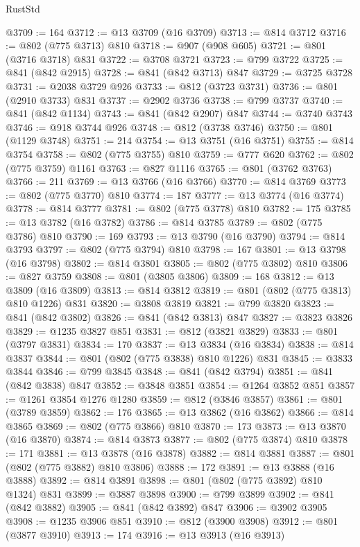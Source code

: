 \begin{lexlean}{RustStd}
\begin{coremodule}
{\begin{coremodule}
{{{{{@3709 := 164
@3712 := @13 @3709 (@16 @3709)
@3713 := @814 @3712
@3716 := @802 (@775 @3713) @810
@3718 := @907 (@908 @605)
@3721 := @801 (@3716 @3718) @831
@3722 := @3708 @3721
@3723 := @799 @3722
@3725 := @841 (@842 @2915)
@3728 := @841 (@842 @3713) @847
@3729 := @3725 @3728
@3731 := @2038 @3729 @926
@3733 := @812 (@3723 @3731)
@3736 := @801 (@2910 @3733) @831
@3737 := @2902 @3736
@3738 := @799 @3737
@3740 := @841 (@842 @1134)
@3743 := @841 (@842 @2907) @847
@3744 := @3740 @3743
@3746 := @918 @3744 @926
@3748 := @812 (@3738 @3746)
@3750 := @801 (@1129 @3748)
@3751 := 214
@3754 := @13 @3751 (@16 @3751)
@3755 := @814 @3754
@3758 := @802 (@775 @3755) @810
@3759 := @777 @620
@3762 := @802 (@775 @3759) @1161
@3763 := @827 @1116
@3765 := @801 (@3762 @3763)
@3766 := 211
@3769 := @13 @3766 (@16 @3766)
@3770 := @814 @3769
@3773 := @802 (@775 @3770) @810
@3774 := 187
@3777 := @13 @3774 (@16 @3774)
@3778 := @814 @3777
@3781 := @802 (@775 @3778) @810
@3782 := 175
@3785 := @13 @3782 (@16 @3782)
@3786 := @814 @3785
@3789 := @802 (@775 @3786) @810
@3790 := 169
@3793 := @13 @3790 (@16 @3790)
@3794 := @814 @3793
@3797 := @802 (@775 @3794) @810
@3798 := 167
@3801 := @13 @3798 (@16 @3798)
@3802 := @814 @3801
@3805 := @802 (@775 @3802) @810
@3806 := @827 @3759
@3808 := @801 (@3805 @3806)
@3809 := 168
@3812 := @13 @3809 (@16 @3809)
@3813 := @814 @3812
@3819 := @801 (@802 (@775 @3813) @810 @1226) @831
@3820 := @3808 @3819
@3821 := @799 @3820
@3823 := @841 (@842 @3802)
@3826 := @841 (@842 @3813) @847
@3827 := @3823 @3826
@3829 := @1235 @3827 @851
@3831 := @812 (@3821 @3829)
@3833 := @801 (@3797 @3831)
@3834 := 170
@3837 := @13 @3834 (@16 @3834)
@3838 := @814 @3837
@3844 := @801 (@802 (@775 @3838) @810 @1226) @831
@3845 := @3833 @3844
@3846 := @799 @3845
@3848 := @841 (@842 @3794)
@3851 := @841 (@842 @3838) @847
@3852 := @3848 @3851
@3854 := @1264 @3852 @851
@3857 := @1261 @3854 @1276 @1280
@3859 := @812 (@3846 @3857)
@3861 := @801 (@3789 @3859)
@3862 := 176
@3865 := @13 @3862 (@16 @3862)
@3866 := @814 @3865
@3869 := @802 (@775 @3866) @810
@3870 := 173
@3873 := @13 @3870 (@16 @3870)
@3874 := @814 @3873
@3877 := @802 (@775 @3874) @810
@3878 := 171
@3881 := @13 @3878 (@16 @3878)
@3882 := @814 @3881
@3887 := @801 (@802 (@775 @3882) @810 @3806)
@3888 := 172
@3891 := @13 @3888 (@16 @3888)
@3892 := @814 @3891
@3898 := @801 (@802 (@775 @3892) @810 @1324) @831
@3899 := @3887 @3898
@3900 := @799 @3899
@3902 := @841 (@842 @3882)
@3905 := @841 (@842 @3892) @847
@3906 := @3902 @3905
@3908 := @1235 @3906 @851
@3910 := @812 (@3900 @3908)
@3912 := @801 (@3877 @3910)
@3913 := 174
@3916 := @13 @3913 (@16 @3913)
}}}}}
\end{coremodule}}
\end{coremodule}
\end{lexlean}

